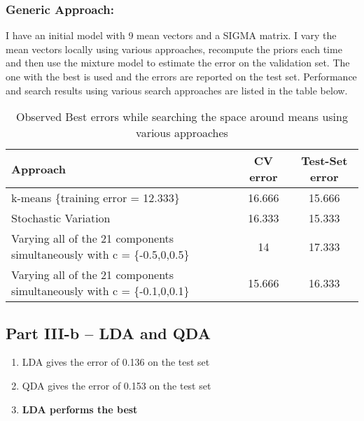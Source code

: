 \documentclass[12pt]{article}%
\begin{document}
\subsubsection{Generic Approach:}
I have an initial model with 9 mean vectors and a SIGMA matrix. I vary the mean vectors locally using various approaches, recompute the priors each time and then use the mixture model to estimate the error on the validation set. The one with the best is used and the errors are reported on the test set. Performance and search results using various search approaches are listed in the table below. 

\begin{table}
\centering
\begin{tabular}{|p{6cm}|c|c|}
\hline
Approach & CV error & Test-Set error \\ \hline
k-means \{training error = 12.333\} & 16.666 & 15.666 \\ \hline
Stochastic Variation & 16.333 & 15.333 \\ \hline
Varying all of the 21 components simultaneously with c = \{-0.5,0,0.5\} & 14 & 17.333 \\ \hline
Varying all of the 21 components simultaneously with c = \{-0.1,0,0.1\} & 15.666 & 16.333\\ \hline
\end{tabular}
\caption{Observed Best errors while searching the space around means using various approaches}
\end{table}

\subsection{Part III-b -- LDA and QDA}
\begin{enumerate}
\item LDA gives the error of 0.136 on the test set
\item QDA gives the error of 0.153 on the test set
\item {\bf LDA performs the best}
\end{enumerate}
\end{document}
